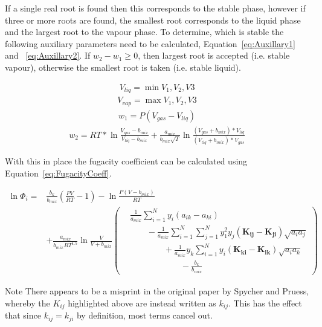 If a single real root is found then this corresponds to the stable phase, however if three or more roots are found, the smallest root corresponds to the liquid phase and the largest root to the vapour phase. To determine, which is stable the following auxiliary parameters need to be calculated, Equation~\eqref{eq:Auxillary1} and ~\eqref{eq:Auxillary2}. If \(w_2 - w_1 \geq 0\), then largest root is accepted (i.e. stable vapour), otherwise the smallest root is taken (i.e. stable liquid).

\begin{align} 
    V_{liq} = \min V_1, V_2, V3
\end{align}
\begin{align} 
    V_{vap} = \max V_1, V_2, V3
\end{align}
\begin{align} 
    w_1 = P(V_{gas}-V_{liq})  \label{eq:Auxillary1}
\end{align}
\begin{align} 
    w_2 = RT * \ln \frac{V_{gas}-b_{mix}}{V_{liq}-b_{mix}} + \frac{a_{mix}}{b_{mix}\sqrt{T}} \ln \frac{(V_{gas} + b_{mix})*V_{liq}}{(V_{liq} + b_{mix})*V_{gas}}  \label{eq:Auxillary2}
\end{align}

With this in place the fugacity coefficient can be calculated using Equation~\eqref{eq:FugacityCoeff}. 

\begin{equation}
    \label{eq:FugacityCoeff}
    \begin{split}
        \ln \Phi_i =& \frac{b_k}{b_{mix}} \left( \frac{PV}{RT} - 1 \right) - \ln \frac{P(V-b_{mix})}{RT} \\
        & + \frac{a_{mix}}{b_{mix}RT^{1.5}} \ln \frac{V}{V+b_{mix}}\left(
        \begin{aligned}
            & \frac{1}{a_{mix}}\sum_{i=1}^N y_i(a_{ik} - a_{ki}) \\
            & \qquad - \frac{1}{a_{mix}}\sum_{i=1}^N\sum_{j=1}^N y_1^2 y_j (\mathbf{K_{ij}} - \mathbf{K_{ji}})\sqrt{a_i a_j} \\
            & \qquad \qquad + \frac{1}{a_{mix}} y_k \sum_{i=1}^N y_i(\mathbf{K_{ki}} - \mathbf{K_{ik}})\sqrt{a_i a_k} \\
            & \qquad \qquad \qquad- \frac{b_k}{b_{mix}}
        \end{aligned}
        \right)
    \end{split}
\end{equation}

\begin{notes}{Note}
    There appears to be a misprint in the original paper by Spycher and Pruess, whereby the \(K_{ij}\) highlighted above are instead written as \(k_{ij}\). This has the effect that since \(k_{ij} = k_{ji}\) by definition, most terms cancel out.
\end{notes}

